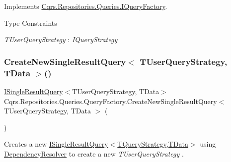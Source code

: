 Implements \hyperlink{interfaceCqrs_1_1Repositories_1_1Queries_1_1IQueryFactory_af8b443851e8112dc70cbc7fe32029ccb_af8b443851e8112dc70cbc7fe32029ccb}{Cqrs.\+Repositories.\+Queries.\+I\+Query\+Factory}.

\begin{Desc}
\item[Type Constraints]\begin{description}
\item[{\em T\+User\+Query\+Strategy} : {\em I\+Query\+Strategy}]\end{description}
\end{Desc}
\mbox{\label{classCqrs_1_1Repositories_1_1Queries_1_1QueryFactory_aefca41f8cab3f333984b782e7c87f3d1_aefca41f8cab3f333984b782e7c87f3d1}} 
\subsubsection{\texorpdfstring{Create\+New\+Single\+Result\+Query$<$ T\+User\+Query\+Strategy, T\+Data $>$()}{CreateNewSingleResultQuery< TUserQueryStrategy, TData >()}}
{\footnotesize\ttfamily \hyperlink{interfaceCqrs_1_1Repositories_1_1Queries_1_1ISingleResultQuery}{I\+Single\+Result\+Query}$<$T\+User\+Query\+Strategy, T\+Data$>$ Cqrs.\+Repositories.\+Queries.\+Query\+Factory.\+Create\+New\+Single\+Result\+Query$<$ T\+User\+Query\+Strategy, T\+Data $>$ (\begin{DoxyParamCaption}{ }\end{DoxyParamCaption})}



Creates a new \hyperlink{interfaceCqrs_1_1Repositories_1_1Queries_1_1ISingleResultQuery}{I\+Single\+Result\+Query$<$\+T\+Query\+Strategy,\+T\+Data$>$} using \hyperlink{classCqrs_1_1Repositories_1_1Queries_1_1QueryFactory_a550e1e11b126247c5adebdd384000252_a550e1e11b126247c5adebdd384000252}{Dependency\+Resolver} to create a new {\itshape T\+User\+Query\+Strategy} . 


